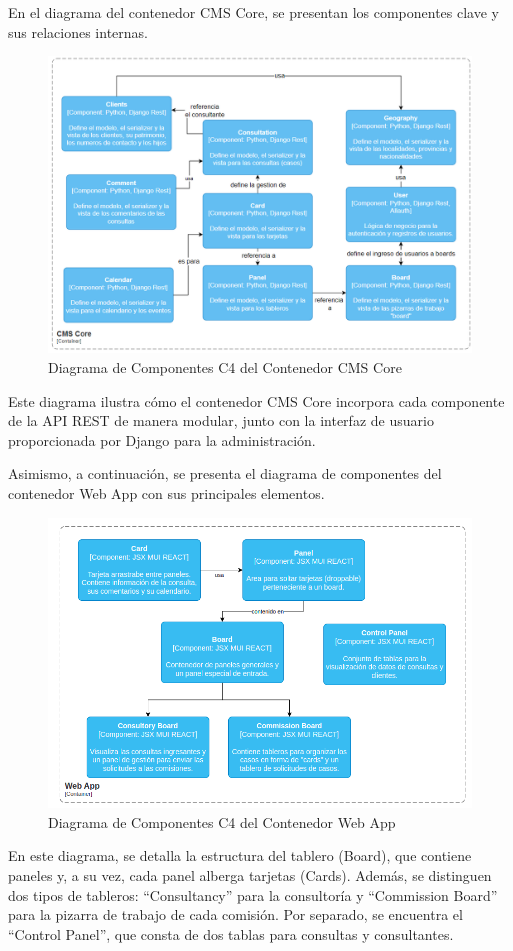 En el diagrama del contenedor CMS Core, se presentan los componentes clave y sus relaciones internas.
\begin{figure}[H]
\centering
\includegraphics[width=1\linewidth]{fig/container-cms-core.png}
\caption{Diagrama de Componentes C4 del Contenedor CMS Core}
\label{fig:c4-03-cmscore}
\end{figure}
Este diagrama ilustra cómo el contenedor CMS Core incorpora cada componente de la API REST de manera modular, junto con la interfaz de usuario proporcionada por Django para la administración.

Asimismo, a continuación, se presenta el diagrama de componentes del contenedor Web App con sus principales elementos.
\begin{figure}[H]
\centering
\includegraphics[width=1\linewidth]{fig/container-web-app.png}
\caption{Diagrama de Componentes C4 del Contenedor Web App}
\label{fig:c4-03-webapp}
\end{figure}
En este diagrama, se detalla la estructura del tablero (Board), que contiene paneles y, a su vez, cada panel alberga tarjetas (Cards). Además, se distinguen dos tipos de tableros: ``Consultancy'' para la consultoría y ``Commission Board'' para la pizarra de trabajo de cada comisión. Por separado, se encuentra el ``Control Panel'', que consta de dos tablas para consultas y consultantes.



